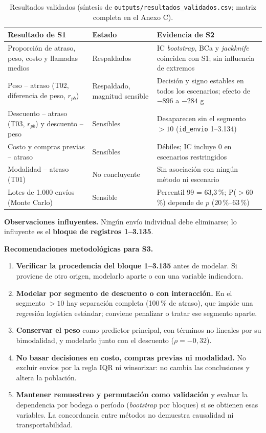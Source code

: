 \documentclass[11pt,a4paper]{article}
\newcommand{\codigo}[1]{{\small\texttt{#1}}}
\begin{document}
\begin{table}[H]\centering\footnotesize\setlength{\tabcolsep}{4pt}
\caption{Resultados validados (síntesis de \codigo{outputs/resultados\_validados.csv}; matriz completa en el Anexo C).}\label{tab:val}
\begin{tabular}{@{}>{\raggedright\arraybackslash}p{5.4cm} >{\raggedright\arraybackslash}p{3.2cm} >{\raggedright\arraybackslash}p{6.4cm}@{}}\toprule
Resultado de S1 & Estado & Evidencia de S2\\\midrule
Proporción de atraso, peso, costo y llamadas medios & Respaldados & IC \emph{bootstrap}, BCa y \emph{jackknife} coinciden con S1; sin influencia de extremos\\
Peso -- atraso (T02, diferencia de peso, $r_{pb}$) & Respaldado, magnitud sensible & Decisión y signo estables en todos los escenarios; efecto de $-896$ a $-284$ g\\
Descuento -- atraso (T03, $r_{pb}$) y descuento -- peso & Sensibles & Desaparecen sin el segmento $> 10$ (\codigo{id\_envio} 1--3.134)\\
Costo y compras previas -- atraso & Sensibles & Débiles; IC incluye 0 en escenarios restringidos\\
Modalidad -- atraso (T01) & No concluyente & Sin asociación con ningún método ni escenario\\
Lotes de 1.000 envíos (Monte Carlo) & Sensible & Percentil 99 = 63,3\,\%; P($>$60\,\%) depende de $p$ (20\,\%--63\,\%)\\\bottomrule
\end{tabular}\end{table}

\textbf{Observaciones influyentes.} Ningún envío individual debe eliminarse; lo influyente es el \textbf{bloque de registros 1--3.135}.

\textbf{Recomendaciones metodológicas para S3.}
\begin{enumerate}
\item \textbf{Verificar la procedencia del bloque 1--3.135} antes de modelar. Si proviene de otro origen, modelarlo aparte o con una variable indicadora.
\item \textbf{Modelar por segmento de descuento o con interacción.} En el segmento $> 10$ hay separación completa (100\,\% de atraso), que impide una regresión logística estándar; conviene penalizar o tratar ese segmento aparte.
\item \textbf{Conservar el peso} como predictor principal, con términos no lineales por su bimodalidad, y modelarlo junto con el descuento ($\rho = -0{,}32$).
\item \textbf{No basar decisiones en costo, compras previas ni modalidad.} No excluir envíos por la regla IQR ni winsorizar: no cambia las conclusiones y altera la población.
\item \textbf{Mantener remuestreo y permutación como validación} y evaluar la dependencia por bodega o período (\emph{bootstrap} por bloques) si se obtienen esas variables. La concordancia entre métodos no demuestra causalidad ni transportabilidad.
\end{enumerate}
\end{document}
